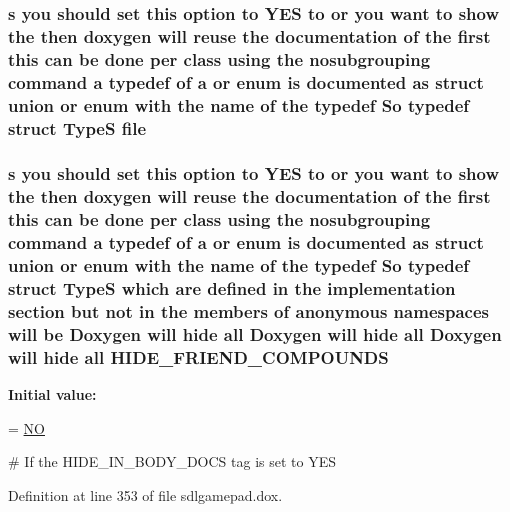 \hypertarget{sdlgamepad_8dox_a049a073e5602cc325f7559a06c5a2420}{
\subsubsection[{file}]{ {\bf s} you should {\bf set} this option to Y\-E\-S to or you want to show the then doxygen will reuse the documentation of the {\bf first} this can be {\bf done} per class using the nosubgrouping command {\bf a} typedef of {\bf a} or enum is documented as {\bf struct} {\bf union} or enum with the {\bf name} of the typedef So typedef {\bf struct} {\bf Type\-S} file}}\label{sdlgamepad_8dox_a049a073e5602cc325f7559a06c5a2420}
\hypertarget{sdlgamepad_8dox_a90cb1e2bfb8402bdac3320203fe5276a}{
\subsubsection[{H\-I\-D\-E\-\_\-\-F\-R\-I\-E\-N\-D\-\_\-\-C\-O\-M\-P\-O\-U\-N\-D\-S}]{ {\bf s} you should {\bf set} this option to Y\-E\-S to or you want to show the then doxygen will reuse the documentation of the {\bf first} this can be {\bf done} per class using the nosubgrouping command {\bf a} typedef of {\bf a} or enum is documented as {\bf struct} {\bf union} or enum with the {\bf name} of the typedef So typedef {\bf struct} {\bf Type\-S} which {\bf are} defined {\bf in} the implementation section but {\bf not} {\bf in} the members of anonymous namespaces will be Doxygen will hide all Doxygen will hide all Doxygen will hide all H\-I\-D\-E\-\_\-\-F\-R\-I\-E\-N\-D\-\_\-\-C\-O\-M\-P\-O\-U\-N\-D\-S}}\label{sdlgamepad_8dox_a90cb1e2bfb8402bdac3320203fe5276a}
{\bfseries Initial value\-:}
\begin{DoxyCode}
= \hyperlink{sdlgamepad_8dox_a0f6a46245280dc38baf9600906aa1393}{NO}

\textcolor{preprocessor}{# If the HIDE\_IN\_BODY\_DOCS tag is set to YES}
\end{DoxyCode}


Definition at line 353 of file sdlgamepad.\-dox.

